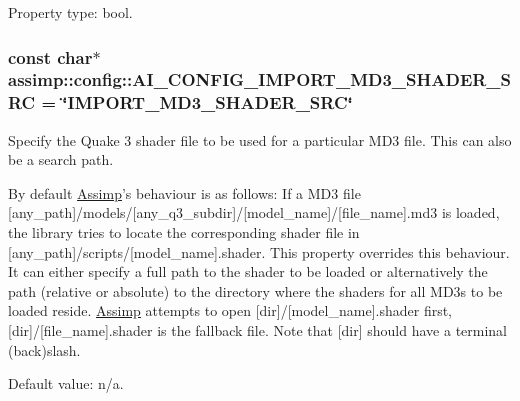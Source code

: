 Property type\+: bool. \hypertarget{namespaceassimp_1_1config_a30c6e61323ae2e07425f9d9f6bc14862}{
\subsubsection[{A\+I\+\_\+\+C\+O\+N\+F\+I\+G\+\_\+\+I\+M\+P\+O\+R\+T\+\_\+\+M\+D3\+\_\+\+S\+H\+A\+D\+E\+R\+\_\+\+S\+R\+C}]{\setlength{\rightskip}{0pt plus 5cm}const char$\ast$ assimp\+::config\+::\+A\+I\+\_\+\+C\+O\+N\+F\+I\+G\+\_\+\+I\+M\+P\+O\+R\+T\+\_\+\+M\+D3\+\_\+\+S\+H\+A\+D\+E\+R\+\_\+\+S\+R\+C = \char`\"{}I\+M\+P\+O\+R\+T\+\_\+\+M\+D3\+\_\+\+S\+H\+A\+D\+E\+R\+\_\+\+S\+R\+C\char`\"{}}}\label{namespaceassimp_1_1config_a30c6e61323ae2e07425f9d9f6bc14862}
Specify the Quake 3 shader file to be used for a particular M\+D3 file. This can also be a search path.

By default \hyperlink{class_assimp}{Assimp}'s behaviour is as follows\+: If a M\+D3 file {\ttfamily \mbox{[}any\+\_\+path\mbox{]}/models/\mbox{[}any\+\_\+q3\+\_\+subdir\mbox{]}/\mbox{[}model\+\_\+name\mbox{]}/\mbox{[}file\+\_\+name\mbox{]}.md3} is loaded, the library tries to locate the corresponding shader file in {\ttfamily \mbox{[}any\+\_\+path\mbox{]}/scripts/\mbox{[}model\+\_\+name\mbox{]}.shader}. This property overrides this behaviour. It can either specify a full path to the shader to be loaded or alternatively the path (relative or absolute) to the directory where the shaders for all M\+D3s to be loaded reside. \hyperlink{class_assimp}{Assimp} attempts to open {\ttfamily \mbox{[}dir\mbox{]}/\mbox{[}model\+\_\+name\mbox{]}.shader} first, {\ttfamily \mbox{[}dir\mbox{]}/\mbox{[}file\+\_\+name\mbox{]}.shader} is the fallback file. Note that {\ttfamily \mbox{[}dir\mbox{]}} should have a terminal (back)slash.

Default value\+: n/a.

